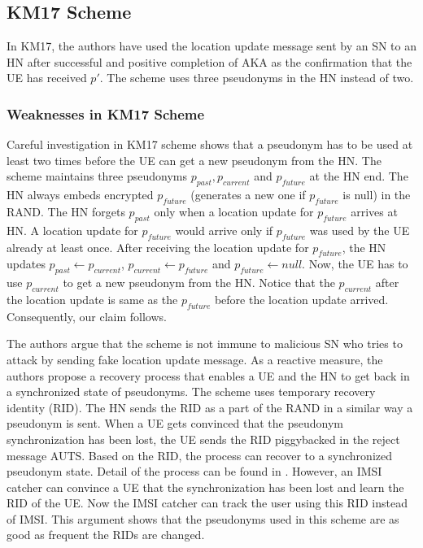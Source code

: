 \documentclass{llncs} %
\begin{document}
\subsection{KM17 Scheme}
In KM17, the authors have used the location update message sent by an SN to an HN after successful and positive completion of AKA as the confirmation that the UE has received $p'$. The scheme uses three pseudonyms in the HN instead of two. 


\subsubsection{Weaknesses in KM17 Scheme}
Careful investigation in KM17 scheme shows that a pseudonym has to be used at least two times before the UE can get a new pseudonym from the HN. The scheme maintains three pseudonyms $p_{past},p_{current}$ and $p_{future}$ at the HN end. The HN always embeds encrypted $p_{future}$ (generates a new one if $p_{future}$ is null) in the RAND. The HN forgets $p_{past}$ only when a location update for $p_{future}$ arrives at HN. A location update for $p_{future}$ would arrive only if $p_{future}$ was used by the UE already at least once. After receiving the location update for $p_{future}$, the HN updates $p_{past} \leftarrow p_{current}$, $p_{current} \leftarrow p_{future}$ and $p_{future} \leftarrow null$. Now, the UE has to use $p_{current}$ to get a new pseudonym from the HN. Notice that the $p_{current}$ after the location update is same as the $p_{future}$ before the location update arrived. Consequently, our claim follows.

The authors argue that the scheme is not immune to malicious SN who tries to attack by sending fake location update message. As a reactive measure, the authors propose a recovery process that enables a UE and the HN to get back in a synchronized state of pseudonyms. The scheme uses temporary recovery identity (RID). The HN sends the RID as a part of the RAND in a similar way a pseudonym is sent. When a UE gets convinced that the pseudonym synchronization has been lost, the UE sends the RID piggybacked in the reject message AUTS. Based on the RID, the process can recover to a synchronized pseudonym state. Detail of the process can be found in \cite{wisec17}. However, an IMSI catcher can convince a UE that the synchronization has been lost and learn the RID of the UE. Now the IMSI catcher can track the user using this RID instead of IMSI. This argument shows that the pseudonyms used in this scheme are as good as frequent the RIDs are changed. 
\end{document}
